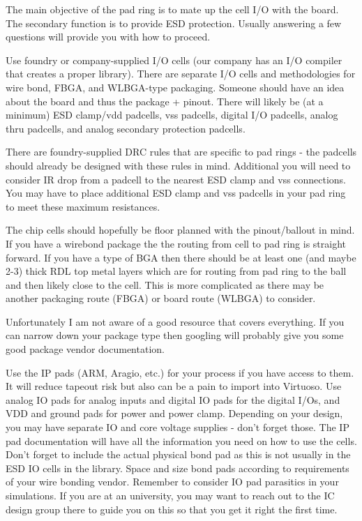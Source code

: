 \documentclass{article}
\begin{document}
\begin{info}
	
	The main objective of the pad ring is to mate up the cell I/O with the board. The secondary function is to provide ESD protection. Usually answering a few questions will provide you with how to proceed.

	Use foundry or company-supplied I/O cells (our company has an I/O compiler that creates a proper library). There are separate I/O cells and methodologies for wire bond, FBGA, and WLBGA-type packaging. Someone should have an idea about the board and thus the package + pinout. There will likely be (at a minimum) ESD clamp/vdd padcells, vss padcells, digital I/O padcells, analog thru padcells, and analog secondary protection padcells.

	There are foundry-supplied DRC rules that are specific to pad rings - the padcells should already be designed with these rules in mind. Additional you will need to consider IR drop from a padcell to the nearest ESD clamp and vss connections. You may have to place additional ESD clamp and vss padcells in your pad ring to meet these maximum resistances.

	The chip cells should hopefully be floor planned with the pinout/ballout in mind. If you have a wirebond package the the routing from cell to pad ring is straight forward. If you have a type of BGA then there should be at least one (and maybe 2-3) thick RDL top metal layers which are for routing from pad ring to the ball and then likely close to the cell. This is more complicated as there may be another packaging route (FBGA) or board route (WLBGA) to consider.

	Unfortunately I am not aware of a good resource that covers everything. If you can narrow down your package type then googling will probably give you some good package vendor documentation.

\end{info}

\begin{info}

	Use the IP pads (ARM, Aragio, etc.) for your process if you have access to them. It will reduce tapeout risk but also can be a pain to import into Virtuoso. Use analog IO pads for analog inputs and digital IO pads for the digital I/Os, and VDD and ground pads for power and power clamp. Depending on your design, you may have separate IO and core voltage supplies - don't forget those. The IP pad documentation will have all the information you need on how to use the cells. Don't forget to include the actual physical bond pad as this is not usually in the ESD IO cells in the library. Space and size bond pads according to requirements of your wire bonding vendor. Remember to consider IO pad parasitics in your simulations. If you are at an university, you may want to reach out to the IC design group there to guide you on this so that you get it right the first time.

\end{info}
	
\end{document}
